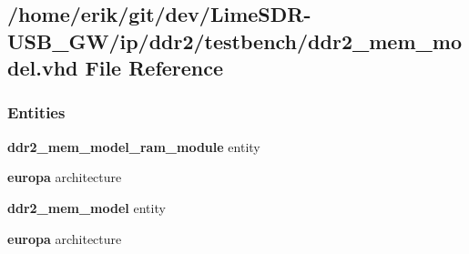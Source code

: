 \subsection{/home/erik/git/dev/\+Lime\+S\+D\+R-\/\+U\+S\+B\+\_\+\+G\+W/ip/ddr2/testbench/ddr2\+\_\+mem\+\_\+model.vhd File Reference}
\label{ddr2__mem__model_8vhd}
\subsubsection*{Entities}
\begin{DoxyCompactItemize}
\item 
{\bf ddr2\+\_\+mem\+\_\+model\+\_\+ram\+\_\+module} entity
\item 
{\bf europa} architecture
\item 
{\bf ddr2\+\_\+mem\+\_\+model} entity
\item 
{\bf europa} architecture
\end{DoxyCompactItemize}
